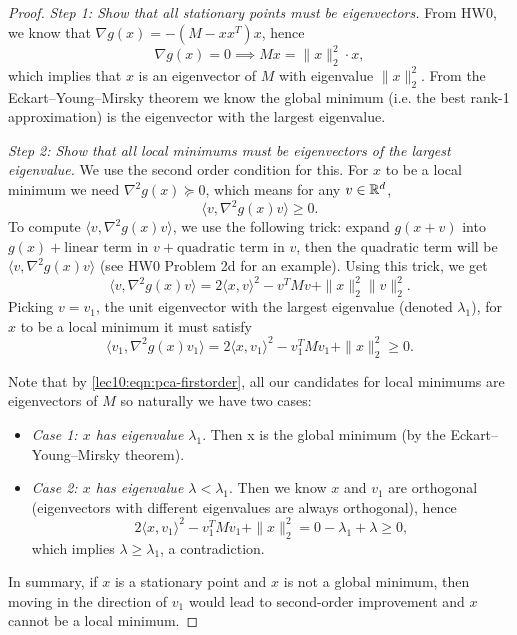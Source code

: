 \begin{proof}

\textit{Step 1: Show that all stationary points must be eigenvectors.} From HW0, we know that $\nabla g(x) = -(M - xx^T)x$, hence
\begin{equation}\label{lec10:eqn:pca-firstorder}
\nabla g(x) = 0 \implies Mx = \|x\|_2^2\cdot x,
\end{equation}
which implies that $x$ is an eigenvector of $M$ with eigenvalue $\|x\|_2^2$. From the Eckart–Young–Mirsky theorem we know the global minimum (i.e. the best rank-1 approximation) is the eigenvector with the largest eigenvalue.

\textit{Step 2: Show that all local minimums must be eigenvectors of the largest eigenvalue.} We use the second order condition for this. For $x$ to be a local minimum we need $\nabla^2g(x) \succeq 0$, which means for any $v \in  \mathbb R^d$, 
\begin{equation}
\langle v, \nabla^2g(x) v \rangle \geq 0.
\end{equation}
To compute $\langle v, \nabla^2g(x) v \rangle$, we use the following trick: expand $g(x + v)$ into $g(x) + \text{linear term in } v + \text{quadratic term in } v$, then the quadratic term will be $\langle v, \nabla^2g(x) v \rangle$ (see HW0 Problem 2d for an example). Using this trick, we get 
\begin{equation}
\langle v, \nabla^2g(x) v \rangle = 2\langle x, v \rangle^2 - v^TMv + \|x\|_2^2\|v\|_2^2. 
\end{equation}
Picking $v = v_1$, the unit eigenvector with the largest eigenvalue (denoted $\lambda_1$), for $x$ to be a local minimum it must satisfy 
\begin{equation}
\langle v_1, \nabla^2g(x) v_1 \rangle = 2\langle x, v_1 \rangle^2 - v_1^TMv_1 + \|x\|_2^2 \geq 0.
\end{equation}

Note that by \eqref{lec10:eqn:pca-firstorder}, all our candidates for local minimums are eigenvectors of $M$ so naturally we have two cases:
\begin{itemize}
\item \textit{Case 1: $x$ has eigenvalue $\lambda_1$}. Then x is the global minimum (by the Eckart–Young–Mirsky theorem).
\item \textit{Case 2: $x$ has eigenvalue $\lambda < \lambda_1$}. Then we know $x$ and $v_1$ are orthogonal (eigenvectors with different eigenvalues are always orthogonal), hence 
\begin{equation}
2\langle x, v_1 \rangle^2 - v_1^TMv_1 + \|x\|_2^2 = 0  -\lambda_1 + \lambda \geq 0,
\end{equation}
which implies $\lambda \geq \lambda_1$, a contradiction. 
\end{itemize}

In summary, if $x$ is a stationary point and $x$ is not a global minimum, then moving in the direction of $v_1$ would lead to second-order improvement and $x$ cannot be a local minimum. 
\end{proof}

